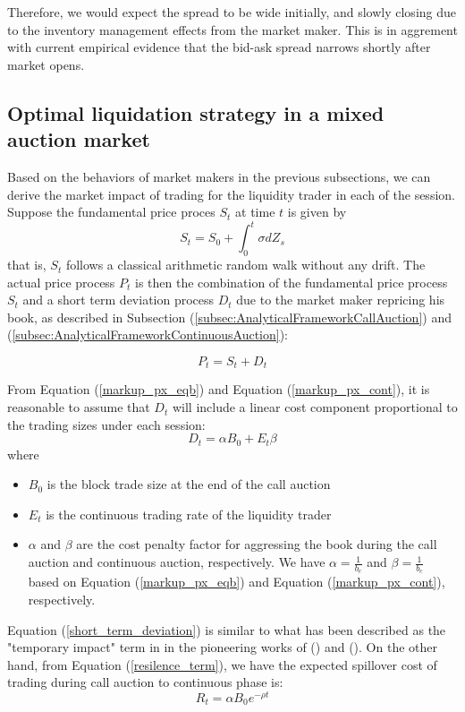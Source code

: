 \documentclass{article}
\begin{document}
Therefore, we would expect the spread to be wide initially, and slowly closing due to the inventory management effects from the market maker. This is in aggrement with current empirical evidence that the bid-ask spread narrows shortly after market opens.

\subsection{Optimal liquidation strategy in a mixed auction market}

Based on the behaviors of market makers in the previous subsections, we can derive the market impact of trading for the liquidity trader in each of the session. Suppose the fundamental price proces $S_t$ at time $t$ is given by
\[
  S_t = S_0 + \int_0^t \sigma dZ_s
\]
that is, $S_t$ follows a classical arithmetic random walk without any drift. The actual price process $P_t$ is then the combination of the fundamental price process $S_t$ and a short term deviation process $D_t$ due to the market maker repricing his book, as described in Subsection (\ref{subsec:AnalyticalFrameworkCallAuction}) and (\ref{subsec:AnalyticalFrameworkContinuousAuction}):

\[
  P_t = S_t + D_t
\]

From Equation (\ref{markup_px_eqb}) and Equation (\ref{markup_px_cont}), it is reasonable to assume that $D_t$ will include a linear cost component proportional to the trading sizes under each session:
\begin{equation}\label{short_term_deviation}
  D_t = \alpha B_0 + E_t \beta
\end{equation}
where
\begin{itemize}
  \item $B_0$ is the block trade size at the end of the call auction
  \item $E_t$ is the continuous trading rate of the liquidity trader
  \item $\alpha$ and $\beta$ are the cost penalty factor for aggressing the book during the call auction and continuous auction, respectively. We have $\alpha=\frac{1}{b_e}$ and $\beta=\frac{1}{b_c}$ based on Equation (\ref{markup_px_eqb}) and Equation (\ref{markup_px_cont}), respectively.
\end{itemize}
Equation (\ref{short_term_deviation}) is similar to what has been described as the "temporary impact" term in in the pioneering works of (\cite{BertimasLo1999}) and (\cite{AlmgrenChriss2000}). On the other hand, from Equation (\ref{resilence_term}), we have the expected spillover cost of trading during call auction to continuous phase is:
\[
  R_t = \alpha B_0 e^{-\rho t}
\]
\end{document}

